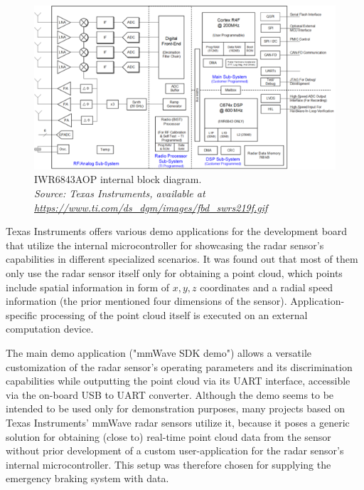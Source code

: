 \begin{figure}[!htbp]
    \centering
    \includegraphics[width=1.0\linewidth]{images/blockdiagram.png}
    \caption{IWR6843AOP internal block diagram.\\
    \textit{Source: Texas Instruments, available at \url{https://www.ti.com/ds_dgm/images/fbd_swrs219f.gif}}}
    \label{fig:IWR6843AOP_internal}
\end{figure}

\FloatBarrier\noindent
Texas Instruments offers various demo applications for the development board that utilize the internal microcontroller for showcasing the radar sensor's capabilities in different specialized scenarios.
It was found out that most of them only use the radar sensor itself only for obtaining a point cloud, which points include spatial information in form of $x,y,z$ coordinates and a radial speed information (the prior mentioned four dimensions of the sensor).
Application-specific processing of the point cloud itself is executed on an external computation device.
\par
The main demo application ("mmWave SDK demo") allows a versatile customization of the radar sensor's operating parameters and its discrimination capabilities while outputting the point cloud via its UART interface, accessible via the on-board USB to UART converter.
Although the demo seems to be intended to be used only for demonstration purposes, many projects based on Texas Instruments' mmWave radar sensors utilize it, because it poses a generic solution for obtaining (close to) real-time point cloud data from the sensor without prior development of a custom user-application for the radar sensor's internal microcontroller.
This setup was therefore chosen for supplying the emergency braking system with data.

